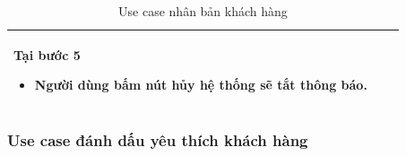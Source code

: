 \documentclass[12pt,a4paper]{article}
\begin{document}
\begin{table}[H]
\begin{tabular}{|p{3.5cm}|p{11.5cm}|c|}
            Tại bước 5\newline
            \vspace{-.8cm}\begin{itemize}
                              \item Người dùng bấm nút hủy hệ thống sẽ tắt thông báo.
            \end{itemize} \\
            \hline
        \end{tabular}
        \caption{Use case nhân bản khách hàng }
    \end{table}


    \subsubsection*{Use case đánh dấu yêu thích khách hàng}
\end{document}
